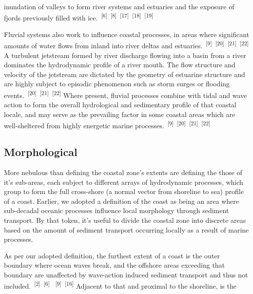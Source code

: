 \documentclass{article}
\begin{document}
\newpage

\par{\noindent inundation of valleys to form river systems and estuaries and the exposure of fjords previously filled with ice.~\textsuperscript{[6]}~\textsuperscript{[8]}~\textsuperscript{[17]}~\textsuperscript{[18]}~\textsuperscript{[19]}}

\par{Fluvial systems also work to influence coastal processes, in areas where significant amounts of water flows from inland into river deltas and estuaries.~\textsuperscript{[9]}~\textsuperscript{[20]}~\textsuperscript{[21]}~\textsuperscript{[22]} A turbulent jetstream formed by river discharge flowing into a basin from a river dominates the hydrodynamic profile of a river mouth. The flow structure and velocity of the jetstream are dictated by the geometry of estuarine structure and are highly subject to episodic phenomenon such as storm surges or flooding events.~\textsuperscript{[20]}~\textsuperscript{[21]}~\textsuperscript{[22]} Where present, fluvial processes combine with tidal and wave action to form the overall hydrological and sedimentary profile of that coastal locale, and may serve as the prevailing factor in some coastal areas which are well-sheltered from highly energetic marine processes.~\textsuperscript{[9]}~\textsuperscript{[20]}~\textsuperscript{[21]}~\textsuperscript{[22]}}

\subsection{Morphological}

\par{\hspace{.5cm}More nebulous than defining the coastal zone's extents are defining the those of it's sub-areas, each subject to different arrays of hydrodynamic processes, which group to form the full cross-shore (a normal vector from shoreline to sea) profile of a coast. Earlier, we adopted a definition of the coast as being an area where sub-decadal oceanic processes influence local morphology through sediment transport. By that token, it's useful to divide the coastal zone into discrete areas based on the amount of sediment transport occurring locally as a result of marine processes.} 

\par{As per our adopted definition, the furthest extent of a coast is the outer boundary where ocean waves break, and the offshore areas exceeding that boundary are unaffected by wave-action induced sediment transport and thus not included.~\textsuperscript{[2]}~\textsuperscript{[6]}  ~\textsuperscript{[9]}~\textsuperscript{[16]} Adjacent to that and proximal to the shoreline, is the}
\end{document}
